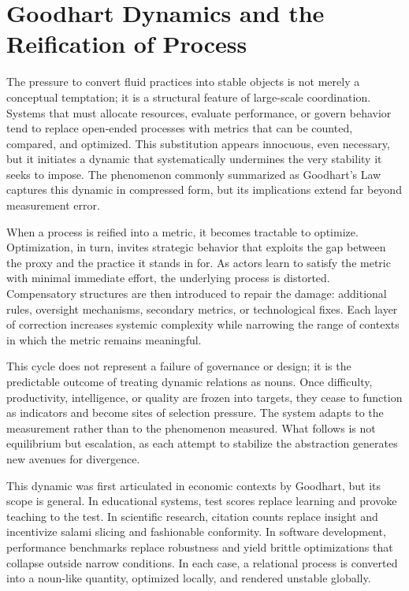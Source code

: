 \documentclass[12pt]{article}
\begin{document}
\section{Goodhart Dynamics and the Reification of Process}

The pressure to convert fluid practices into stable objects is not merely a conceptual temptation; it is a structural feature of large-scale coordination. Systems that must allocate resources, evaluate performance, or govern behavior tend to replace open-ended processes with metrics that can be counted, compared, and optimized. This substitution appears innocuous, even necessary, but it initiates a dynamic that systematically undermines the very stability it seeks to impose. The phenomenon commonly summarized as Goodhart’s Law captures this dynamic in compressed form, but its implications extend far beyond measurement error.

When a process is reified into a metric, it becomes tractable to optimize. Optimization, in turn, invites strategic behavior that exploits the gap between the proxy and the practice it stands in for. As actors learn to satisfy the metric with minimal immediate effort, the underlying process is distorted. Compensatory structures are then introduced to repair the damage: additional rules, oversight mechanisms, secondary metrics, or technological fixes. Each layer of correction increases systemic complexity while narrowing the range of contexts in which the metric remains meaningful.

This cycle does not represent a failure of governance or design; it is the predictable outcome of treating dynamic relations as nouns. Once difficulty, productivity, intelligence, or quality are frozen into targets, they cease to function as indicators and become sites of selection pressure. The system adapts to the measurement rather than to the phenomenon measured. What follows is not equilibrium but escalation, as each attempt to stabilize the abstraction generates new avenues for divergence.

This dynamic was first articulated in economic contexts by Goodhart, but its scope is general. In educational systems, test scores replace learning and provoke teaching to the test. In scientific research, citation counts replace insight and incentivize salami slicing and fashionable conformity. In software development, performance benchmarks replace robustness and yield brittle optimizations that collapse outside narrow conditions. In each case, a relational process is converted into a noun-like quantity, optimized locally, and rendered unstable globally.
\end{document}
